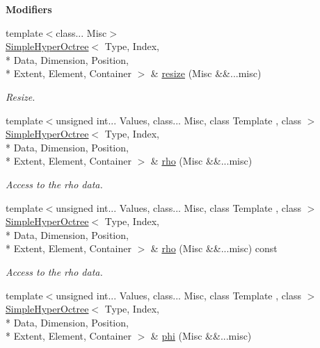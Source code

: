\begin{Indent}{\bf Modifiers}
\begin{DoxyCompactItemize}
{\footnotesize template$<$class... Misc$>$ }\\\hyperlink{exceptionmagrathea_1_1SimpleHyperOctree}{Simple\-Hyper\-Octree}$<$ Type, Index, \\*
Data, Dimension, Position, \\*
Extent, Element, Container $>$ \& \hyperlink{exceptionmagrathea_1_1SimpleHyperOctree_a8e4ffd2c97a91541f939b3b6a7703009}{resize} (Misc \&\&...misc)
\begin{DoxyCompactList}\small\item\em Resize. \end{DoxyCompactList}\item 
{\footnotesize template$<$unsigned int... Values, class... Misc, class Template , class $>$ }\\\hyperlink{exceptionmagrathea_1_1SimpleHyperOctree}{Simple\-Hyper\-Octree}$<$ Type, Index, \\*
Data, Dimension, Position, \\*
Extent, Element, Container $>$ \& \hyperlink{exceptionmagrathea_1_1SimpleHyperOctree_ae2bcdd2c733b4ffa96afc7c03adf4f74}{rho} (Misc \&\&...misc)
\begin{DoxyCompactList}\small\item\em Access to the rho data. \end{DoxyCompactList}\item 
{\footnotesize template$<$unsigned int... Values, class... Misc, class Template , class $>$ }\\\hyperlink{exceptionmagrathea_1_1SimpleHyperOctree}{Simple\-Hyper\-Octree}$<$ Type, Index, \\*
Data, Dimension, Position, \\*
Extent, Element, Container $>$ \& \hyperlink{exceptionmagrathea_1_1SimpleHyperOctree_af37baf544a5d39bccccac15b699a5c11}{rho} (Misc \&\&...misc) const 
\begin{DoxyCompactList}\small\item\em Access to the rho data. \end{DoxyCompactList}\item 
{\footnotesize template$<$unsigned int... Values, class... Misc, class Template , class $>$ }\\\hyperlink{exceptionmagrathea_1_1SimpleHyperOctree}{Simple\-Hyper\-Octree}$<$ Type, Index, \\*
Data, Dimension, Position, \\*
Extent, Element, Container $>$ \& \hyperlink{exceptionmagrathea_1_1SimpleHyperOctree_a55189b99964d0b2c46d517e12364b704}{phi} (Misc \&\&...misc)

\end{DoxyCompactItemize}
\end{Indent}
